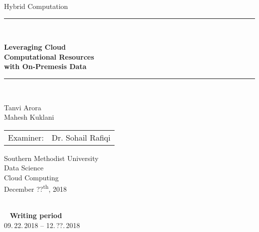    
\begin{titlepage}
\begin{center}

\newcommand{\HorizontalLine}{\rule{\linewidth}{0.3mm}}

{\Large Hybrid Computation}\\[1.3cm]

  

\HorizontalLine \\[0.4cm]
\begin{spacing}{3}
    {\huge \bfseries Leveraging Cloud } \\
    {\huge \bfseries Computational Resources} \\
    {\huge \bfseries with On-Premesis Data
    }\\
\end{spacing}
\HorizontalLine \\[1.5cm]

\begin{spacing}{3}
    {\Huge Tanvi Arora} \\
    {\Huge Mahesh Kuklani} \\[1.5cm]
\end{spacing}

\begin{tabular}[hc]{>{\huge}l >{\huge}l}
Examiner: & Dr. Sohail Rafiqi \\[0.3cm]
\end{tabular}
\vfill  %

\Large {
    Southern Methodist University\\
    Data Science\\
    Cloud Computing\\[0.5cm]
    December ??\textsuperscript{th}, 2018\\
}
\end{center}
\end{titlepage}

\ \vfill \ \\  %
\
\textbf{Writing period}            \smallskip{} \\
09.\,22.\,2018 -- 12.\,??.\,2018   \bigskip{} \\
\